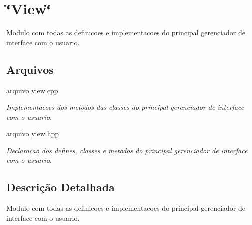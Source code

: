\hypertarget{group__MOD__VIEW}{
\section{\char`\"{}View\char`\"{}}
\label{group__MOD__VIEW}
}


Modulo com todas as definicoes e implementacoes do principal gerenciador de interface com o usuario.  


\subsection*{Arquivos}
\begin{DoxyCompactItemize}
\item 
arquivo \hyperlink{view_8cpp}{view.cpp}


\begin{DoxyCompactList}\small\item\em Implementacoes dos metodos das classes do principal gerenciador de interface com o usuario. \item\end{DoxyCompactList}

\item 
arquivo \hyperlink{view_8hpp}{view.hpp}


\begin{DoxyCompactList}\small\item\em Declaracao dos defines, classes e metodos do principal gerenciador de interface com o usuario. \item\end{DoxyCompactList}

\end{DoxyCompactItemize}


\subsection{Descrição Detalhada}
Modulo com todas as definicoes e implementacoes do principal gerenciador de interface com o usuario. 